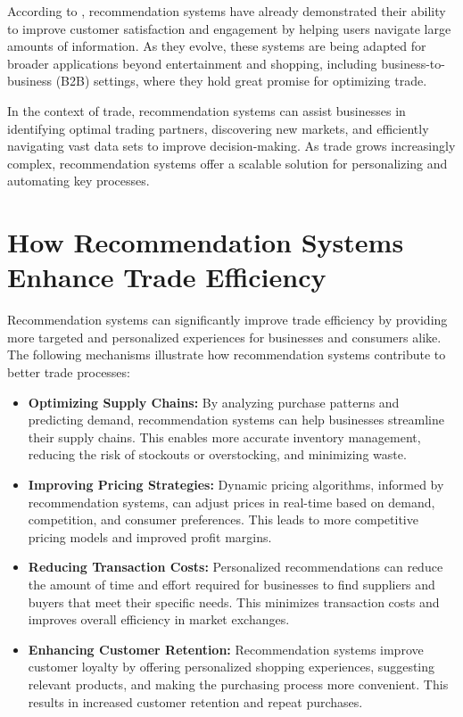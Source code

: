 \documentclass[10pt,twocolumn,twoside,slovak,a4paper]{article}
\begin{document}
\noindent According to \cite{author2023}, recommendation systems have already demonstrated their ability to improve customer satisfaction and engagement by helping users navigate large amounts of information. As they evolve, these systems are being adapted for broader applications beyond entertainment and shopping, including business-to-business (B2B) settings, where they hold great promise for optimizing trade.

In the context of trade, recommendation systems can assist businesses in identifying optimal trading partners, discovering new markets, and efficiently navigating vast data sets to improve decision-making. As trade grows increasingly complex, recommendation systems offer a scalable solution for personalizing and automating key processes.



\section{How Recommendation Systems Enhance Trade Efficiency}

Recommendation systems can significantly improve trade efficiency by providing more targeted and personalized experiences for businesses and consumers alike. The following mechanisms illustrate how recommendation systems contribute to better trade processes:

\begin{itemize}
    \item \textbf{Optimizing Supply Chains:} By analyzing purchase patterns and predicting demand, recommendation systems can help businesses streamline their supply chains. This enables more accurate inventory management, reducing the risk of stockouts or overstocking, and minimizing waste.
    
    \item \textbf{Improving Pricing Strategies:} Dynamic pricing algorithms, informed by recommendation systems, can adjust prices in real-time based on demand, competition, and consumer preferences. This leads to more competitive pricing models and improved profit margins.
    
    \item \textbf{Reducing Transaction Costs:} Personalized recommendations can reduce the amount of time and effort required for businesses to find suppliers and buyers that meet their specific needs. This minimizes transaction costs and improves overall efficiency in market exchanges.
    
    \item \textbf{Enhancing Customer Retention:} Recommendation systems improve customer loyalty by offering personalized shopping experiences, suggesting relevant products, and making the purchasing process more convenient. This results in increased customer retention and repeat purchases.
\end{itemize}
\end{document}
